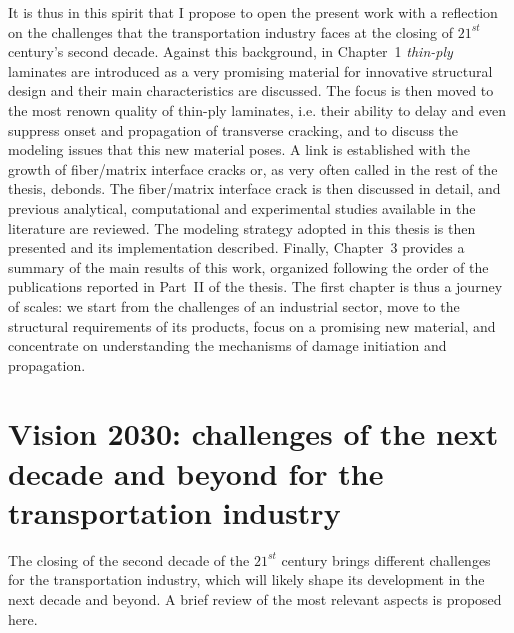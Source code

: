 It is thus in this spirit that I propose to open the present work with a reflection on the challenges that the transportation industry faces at the closing of $21^{st}$ century's second decade. Against this background, in Chapter~1 \emph{thin-ply} laminates are introduced as a very promising material for innovative structural design and their main characteristics are discussed. The focus is then moved to the most renown quality of thin-ply laminates, i.e. their ability to delay and even suppress onset and propagation of transverse cracking, and to discuss the modeling issues that this new material poses. A link is established with the growth of fiber/matrix interface cracks or, as very often called in the rest of the thesis, debonds. The fiber/matrix interface crack is then discussed in detail, and previous analytical, computational and experimental studies available in the literature are reviewed. The modeling strategy adopted in this thesis is then presented and its implementation described. Finally, Chapter~3 provides a summary of the main results of this work, organized following the order of the publications reported in Part~II of the thesis. The first chapter is thus a journey of scales: we start from the challenges of an industrial sector, move to the structural requirements of its products, focus on a promising new material, and concentrate on understanding the mechanisms of damage initiation and propagation.

\section{Vision 2030: challenges of the next decade and beyond for the transportation industry}

The closing of the second decade of the $21^{st}$ century brings different challenges for the transportation industry, which will likely shape its development in the next decade and beyond. A brief review of the most relevant aspects is proposed here.


